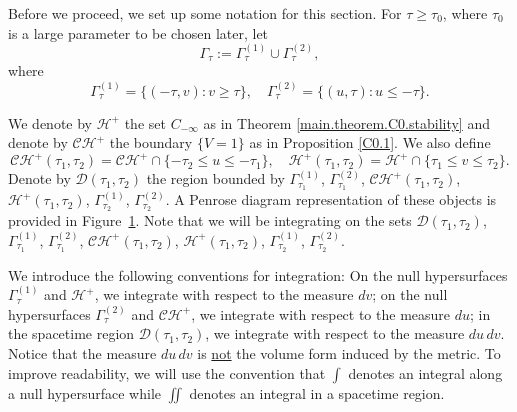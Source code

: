 \documentclass[10pt, reqno]{amsart}
\theoremstyle{definition}
\theoremstyle{remark}
\numberwithin{equation}{section}
\newcommand{\set}[1]{\{#1\}}
\newcommand{\0}{\emptyset}
\newcommand{\Gmm}{\Gamma}
\newcommand{\calC}{\mathcal C}
\newcommand{\calD}{\mathcal D}
\newcommand{\calH}{\mathcal H}
\newcommand{\CH}{\calC \calH^{+}}		%
\newcommand{\EH}{\calH^{+}}
\begin{document}
Before we proceed, we set up some notation for this section. For $\tau\geq \tau_0$, where $\tau_0$ is a large parameter to be chosen later, let
\begin{equation*}
	\Gmm_{\tau} := \Gmm^{(1)}_{\tau} \cup \Gmm^{(2)}_{\tau},
\end{equation*}
where
\begin{equation*}
	\Gmm^{(1)}_{\tau} = 	\set{(-\tau, v) : v \geq \tau}, \quad
	\Gmm^{(2)}_{\tau} = \set{(u, \tau) : u \leq -\tau}.
\end{equation*}

We denote by $\EH$ the set $C_{-\infty}$ as in Theorem \ref{main.theorem.C0.stability} and denote by $\CH$ the boundary $\{V=1\}$ as in Proposition \ref{C0.1}. We also define
\begin{equation*}
	\CH(\tau_{1}, \tau_{2}) = \CH \cap \set{-\tau_{2} \leq u \leq -\tau_{1}}, \quad
	\EH(\tau_{1}, \tau_{2}) = \EH \cap \set{\tau_{1} \leq v \leq \tau_{2}}.
\end{equation*}
Denote by $\calD(\tau_{1}, \tau_{2})$ the region bounded by $\Gmm^{(1)}_{\tau_{1}}$, $\Gmm^{(2)}_{\tau_{1}}$, $\CH(\tau_{1}, \tau_{2})$, $\EH(\tau_{1}, \tau_{2})$, $\Gmm^{(1)}_{\tau_{2}}$, $\Gmm^{(2)}_{\tau_{2}}$. A Penrose diagram representation of these objects is provided in Figure~\ref{fig:interior}. Note that we will be integrating on the sets $\calD(\tau_{1}, \tau_{2})$, $\Gmm^{(1)}_{\tau_{1}}$, $\Gmm^{(2)}_{\tau_{1}}$, $\CH(\tau_{1}, \tau_{2})$, $\EH(\tau_{1}, \tau_{2})$, $\Gmm^{(1)}_{\tau_{2}}$, $\Gmm^{(2)}_{\tau_{2}}$. 

\begin{figure}[h]
\begin{center}
\def\svgwidth{220px}
 
\caption{} \label{fig:interior}
\end{center}
\end{figure}

We introduce the following conventions for integration: On the null hypersurfaces $\Gmm^{(1)}_\tau$ and $\EH$, we integrate with respect to the measure $dv$; on the null hypersurfaces $\Gmm^{(2)}_\tau$ and $\CH$, we integrate with respect to the measure $du$; in the spacetime region $\calD(\tau_1,\tau_2)$, we integrate with respect to the measure $du\, dv$. Notice that the measure $du\, dv$ is \underline{not} the volume form induced by the metric. To improve readability, we will use the convention that $\int$ denotes an integral along a null hypersurface while $\iint$ denotes an integral in a spacetime region.
\end{document}
